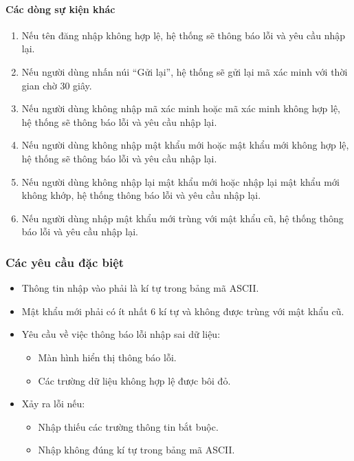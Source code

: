 \paragraph{\textbf{Các dòng sự kiện khác}}
\begin{enumerate}
  \item Nếu tên đăng nhập không hợp lệ, hệ thống sẽ thông báo lỗi và yêu cầu nhập lại.
  \item Nếu người dùng nhấn núi ``Gửi lại'', hệ thống sẽ gửi lại mã xác minh với thời gian chờ 30 giây.
  \item Nếu người dùng không nhập mã xác minh hoặc mã xác minh không hợp lệ, hệ thống sẽ thông báo lỗi và yêu cầu nhập lại.
  \item Nếu người dùng không nhập mật khẩu mới hoặc mật khẩu mới không hợp lệ, hệ thống sẽ thông báo lỗi và yêu cầu nhập lại.
  \item Nếu người dùng không nhập lại mật khẩu mới hoặc nhập lại mật khẩu mới không khớp, hệ thống thông báo lỗi và yêu cầu nhập lại.
  \item Nếu người dùng nhập mật khẩu mới trùng với mật khẩu cũ, hệ thống thông báo lỗi và yêu cầu nhập lại.
\end{enumerate}

\subsubsection{Các yêu cầu đặc biệt}
\begin{itemize}
  \item Thông tin nhập vào phải là kí tự trong bảng mã ASCII.
  \item Mật khẩu mới phải có ít nhất 6 kí tự và không được trùng với mật khẩu cũ.
  \item Yêu cầu về việc thông báo lỗi nhập sai dữ liệu:
    \begin{itemize}
      \item Màn hình hiển thị thông báo lỗi.
      \item Các trường dữ liệu không hợp lệ được bôi đỏ.
    \end{itemize}
  \item Xảy ra lỗi nếu:
    \begin{itemize}
      \item Nhập thiếu các trường thông tin bắt buộc.
      \item Nhập không đúng kí tự trong bảng mã ASCII.
    \end{itemize}
\end{itemize}


